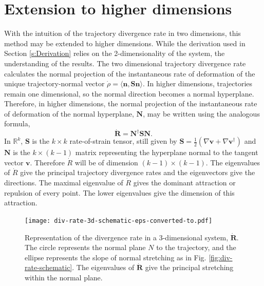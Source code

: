 \documentclass[twocolumn]{svjour3}
\begin{document}
\section{Extension to higher dimensions}\label{s:HigherDimension}
With the intuition of the trajectory divergence rate in two dimensions, this method may be extended to higher dimensions. While the derivation used in Section \ref{s:Derivation} relies on the 2-dimensionality of the system, the understanding of the results. The two dimensional trajectory divergence rate calculates the normal projection of the instantaneous rate of deformation of the unique trajectory-normal vector $\dot{\rho} = \langle \mathbf{n}, \mathbf{S}\mathbf{n}\rangle$. In higher dimensions, trajectories remain one dimensional, so the normal direction becomes a normal hyperplane. Therefore, in higher dimensions, the normal projection of the instantaneous rate of deformation of the normal hyperplane, $\mathbf{N}$, may be written using the analogous formula,
\begin{equation}\label{eq:higherdim-reprate}
\dot{\mathbf{R}} = \mathbf{N}^\dagger \mathbf{S}\mathbf{N}.
\end{equation}
In $\mathbb{R}^k$, $\mathbf{S}$ is the $k\times k$ rate-of-strain tensor, still given by $\mathbf{S}=\tfrac{1}{2}\left(\nabla \mathbf{v}+\nabla \mathbf{v}^\dagger\right)$ and $\mathbf{N}$ is the $k \times (k-1)$ matrix representing the hyperplane normal to the tangent vector $\mathbf{v}$. Therefore $\dot{R}$ will be of dimension $(k-1) \times (k-1)$. The eigenvalues of $\dot{R}$ give the principal trajectory divergence rates and the eigenvectors give the directions. The maximal eigenvalue of $\dot{R}$ gives the dominant attraction or repulsion of every point. The lower eigenvalues give the dimension of this attraction.

\begin{figure}
\centering
\texttt{[image: div-rate-3d-schematic-eps-converted-to.pdf]}
\caption{Representation of the divergence rate in a 3-dimensional system, $\dot{\textbf{R}}$. The circle represents the normal plane $N$ to the trajectory, and the ellipse represents the slope of normal stretching as in Fig. \ref{fig:div-rate-schematic}. The eigenvalues of $\dot{\mathbf{R}}$ give the principal stretching within the normal plane.}
\label{fig:3dDivRateSchematic}
\end{figure}
\end{document}
